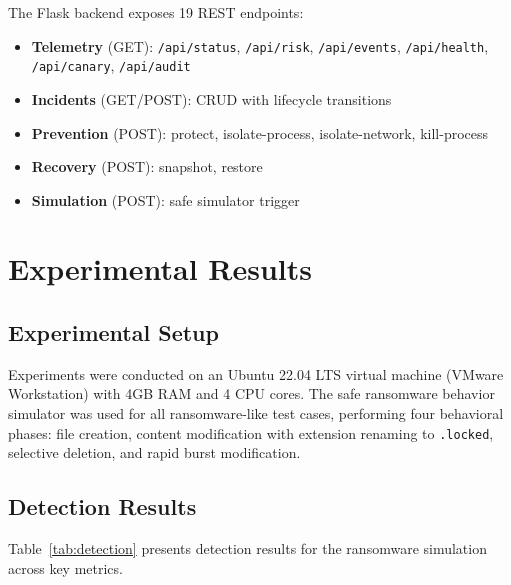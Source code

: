 \documentclass[conference]{IEEEtran}
\begin{document}
The Flask backend exposes 19 REST endpoints:

\begin{itemize}
    \item \textbf{Telemetry} (GET): \texttt{/api/status},
    \texttt{/api/risk}, \texttt{/api/events}, \texttt{/api/health},
    \texttt{/api/canary}, \texttt{/api/audit}
    \item \textbf{Incidents} (GET/POST): CRUD with lifecycle
    transitions
    \item \textbf{Prevention} (POST): protect, isolate-process,
    isolate-network, kill-process
    \item \textbf{Recovery} (POST): snapshot, restore
    \item \textbf{Simulation} (POST): safe simulator trigger
\end{itemize}


\section{Experimental Results}

\subsection{Experimental Setup}

Experiments were conducted on an Ubuntu 22.04 LTS virtual
machine (VMware Workstation) with 4GB RAM and 4 CPU cores.
The safe ransomware behavior simulator was used for all
ransomware-like test cases, performing four behavioral
phases: file creation, content modification with extension
renaming to \texttt{.locked}, selective deletion, and
rapid burst modification.

\subsection{Detection Results}

Table~\ref{tab:detection} presents detection results for
the ransomware simulation across key metrics.
\end{document}
